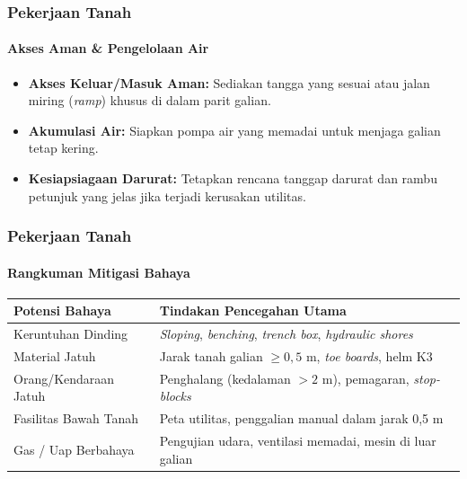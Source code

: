 \documentclass[../main.tex]{subfiles}
\begin{document}
\begin{frame}[mytitle=center,t,mycolor=digiPH_gray,light]
	\frametitle{Pekerjaan Tanah}
	\framesubtitle{Akses Aman \& Pengelolaan Air}
	\begin{itemize}
		\item \textbf{Akses Keluar/Masuk Aman:} Sediakan tangga yang sesuai atau jalan miring (\textit{ramp}) khusus di dalam parit galian.
		\item \textbf{Akumulasi Air:} Siapkan pompa air yang memadai untuk menjaga galian tetap kering.
		\item \textbf{Kesiapsiagaan Darurat:} Tetapkan rencana tanggap darurat dan rambu petunjuk yang jelas jika terjadi kerusakan utilitas.
	\end{itemize}
\end{frame}

\begin{frame}[mytitle=standard,t,mycolor=white,light]
	\frametitle{Pekerjaan Tanah}
	\framesubtitle{Rangkuman Mitigasi Bahaya}
	\centering
	\small
	\begin{tabularx}{\textwidth}{l X}
		\toprule
		\textbf{Potensi Bahaya} & \textbf{Tindakan Pencegahan Utama}                                                  \\
		\midrule
		Keruntuhan Dinding      & \textit{Sloping}, \textit{benching}, \textit{trench box}, \textit{hydraulic shores} \\
		Material Jatuh          & Jarak tanah galian $\ge 0,5\text{ m}$, \textit{toe boards}, helm K3                 \\
		Orang/Kendaraan Jatuh   & Penghalang (kedalaman $>2\text{ m}$), pemagaran, \textit{stop-blocks}               \\
		Fasilitas Bawah Tanah   & Peta utilitas, penggalian manual dalam jarak 0,5 m                                  \\
		Gas / Uap Berbahaya     & Pengujian udara, ventilasi memadai, mesin di luar galian                            \\
		\bottomrule
	\end{tabularx}
\end{frame}
\end{document}
